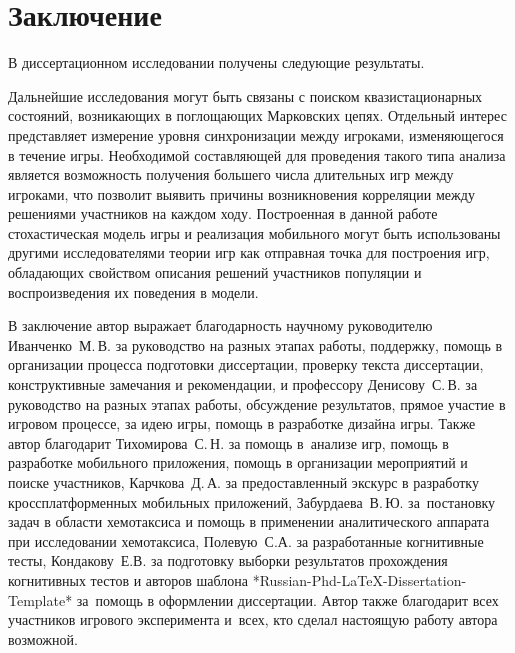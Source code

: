 \chapter*{Заключение}                       %


В диссертационном исследовании получены следующие результаты.


Дальнейшие исследования могут быть связаны с поиском квазистационарных состояний, возникающих в поглощающих Марковских цепях. Отдельный интерес представляет измерение уровня синхронизации между игроками, изменяющегося в течение игры. Необходимой составляющей для проведения такого типа анализа является возможность получения большего числа длительных игр между игроками, что позволит выявить причины возникновения корреляции между решениями участников на каждом ходу. Построенная в данной работе стохастическая модель игры и реализация мобильного могут быть использованы другими исследователями теории игр как отправная точка для построения игр, обладающих свойством описания решений участников популяции и воспроизведения их поведения в модели. 

В заключение автор выражает благодарность научному руководителю Иванченко~М.\,В. за руководство на разных этапах работы, поддержку, помощь в организации процесса подготовки диссертации, проверку текста диссертации, конструктивные замечания и рекомендации, и профессору Денисову~С.\,В. за руководство на разных этапах работы, обсуждение результатов, прямое участие в игровом процессе, за идею игры, помощь в разработке дизайна игры. Также автор благодарит Тихомирова~С.\,Н. за помощь в~анализе игр, помощь в разработке мобильного приложения, помощь в организации мероприятий и поиске участников, Карчкова~Д.\,А. за предоставленный экскурс в разработку кроссплатформенных мобильных приложений, Забурдаева~В.\,Ю. за~постановку задач в области хемотаксиса и помощь в применении аналитического аппарата при исследовании хемотаксиса, Полевую~С.А. за разработанные когнитивные тесты, Кондакову~Е.В. за подготовку выборки результатов прохождения когнитивных тестов и авторов шаблона *Russian-Phd-LaTeX-Dissertation-Template* за~помощь в оформлении диссертации. Автор также благодарит всех участников игрового эксперимента и~всех, кто сделал настоящую работу автора возможной.

